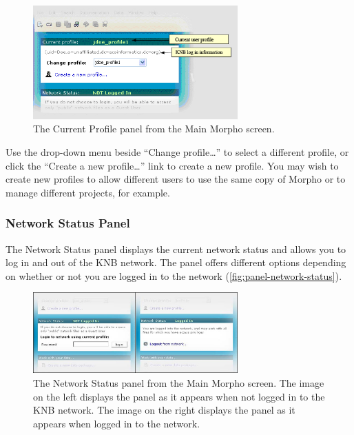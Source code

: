 \begin{figure}
  \centering
    \includegraphics[width=0.7\textwidth]{images/panel-profile.jpg}
  \caption{The Current Profile panel from the Main Morpho screen.}
  \label{fig:panel-profile}
\end{figure}

Use the drop-down menu beside ``Change profile\ldots'' to select a
different profile, or click the ``Create a new profile\ldots'' link to
create a new profile. You may wish to create new profiles to allow
different users to use the same copy of Morpho or to manage different
projects, for example.

\subsubsection[Network Status]{Network Status Panel}
\label{sec:panel-network-status}

The Network Status panel displays the current network status and allows
you to log in and out of the KNB network. The panel offers different
options depending on whether or not you are logged in to the network
(\autoref{fig:panel-network-status}).

\begin{figure}
  \centering
    \includegraphics[width=0.7\textwidth]{images/panel-network-status.jpg}
  \caption{The Network Status panel from the Main Morpho screen. The
    image on the left displays the panel as it appears when not logged
    in to the KNB network. The image on the right displays the panel as
    it appears when logged in to the network.}
  \label{fig:panel-network-status}
\end{figure}

